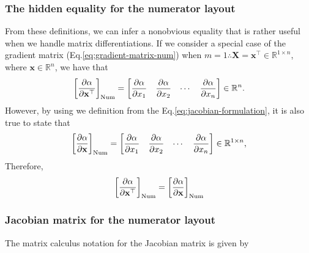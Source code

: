 \documentclass{article}
\begin{document}
\subsubsection{The hidden equality for the numerator layout}

From these definitions, we can infer a nonobvious equality that is rather useful when we handle matrix differentiations. If we consider a special case of the gradient matrix (Eq.\eqref{eq:gradient-matrix-num}) when $m=1 \therefore \mathbf{X} = \mathbf{x}^\top \in \mathbb{R}^{1\times n}$, where $\mathbf{x} \in \mathbb{R}^n$, we have that
\begin{align}
    \left[\dfrac{\partial \alpha}{\partial \mathbf{x}^\top}\right]_{\textnormal{Num}} = \begin{bmatrix} \dfrac{\partial \alpha}{\partial x_{1}} & \dfrac{\partial \alpha}{\partial x_{2}} & \cdots & \dfrac{\partial \alpha}{\partial x_{n}} \end{bmatrix} \in \mathbb{R}^{n}.
\end{align}
However, by using we definition from the Eq.\eqref{eq:jacobian-formulation}, it is also true to state that
\begin{align}
    \left[\dfrac{\partial \alpha}{\partial \mathbf{x}}\right]_{\textnormal{Num}} = \begin{bmatrix} \dfrac{\partial \alpha}{\partial x_{1}} & \dfrac{\partial \alpha}{\partial x_{2}} & \cdots & \dfrac{\partial \alpha}{\partial x_{n}} \end{bmatrix} \in \mathbb{R}^{1 \times n},
\end{align}
Therefore,
\begin{align}
    \label{eq:hidden-num}
    \left[\dfrac{\partial \alpha}{\partial \mathbf{x}^\top}\right]_{\textnormal{Num}} = \left[\dfrac{\partial \alpha}{\partial \mathbf{x}}\right]_{\textnormal{Num}}
\end{align}

\subsubsection{Jacobian matrix for the numerator layout}
The matrix calculus notation for the Jacobian matrix is given by
\end{document}
